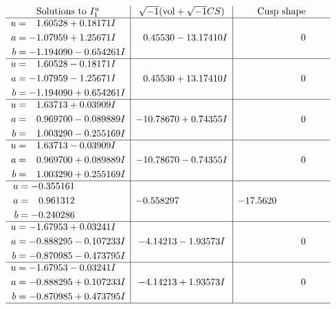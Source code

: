 \documentclass[1p]{elsarticle_modified}
\theoremstyle{definition}
\newcommand{\I}{\sqrt{-1}}
\begin{document}
$$\begin{array}{c|c|c}
\text{Solutions to }I^u_{1}& \I (\text{vol} + \sqrt{-1}CS) & \text{Cusp shape}\\
 \hline 
\begin{aligned}
u &= \phantom{-}1.60528 + 0.18171 I \\
a &= -1.07959 + 1.25671 I \\
b &= -1.194090 - 0.654261 I\end{aligned}
 & \phantom{-}0.45530 - 13.17410 I & \phantom{-0.000000 } 0 \\ \hline\begin{aligned}
u &= \phantom{-}1.60528 - 0.18171 I \\
a &= -1.07959 - 1.25671 I \\
b &= -1.194090 + 0.654261 I\end{aligned}
 & \phantom{-}0.45530 + 13.17410 I & \phantom{-0.000000 } 0 \\ \hline\begin{aligned}
u &= \phantom{-}1.63713 + 0.03909 I \\
a &= \phantom{-}0.969700 - 0.089889 I \\
b &= \phantom{-}1.003290 - 0.255169 I\end{aligned}
 & -10.78670 + 0.74355 I & \phantom{-0.000000 } 0 \\ \hline\begin{aligned}
u &= \phantom{-}1.63713 - 0.03909 I \\
a &= \phantom{-}0.969700 + 0.089889 I \\
b &= \phantom{-}1.003290 + 0.255169 I\end{aligned}
 & -10.78670 - 0.74355 I & \phantom{-0.000000 } 0 \\ \hline\begin{aligned}
u &= -0.355161\phantom{ +0.000000I} \\
a &= \phantom{-}0.961312\phantom{ +0.000000I} \\
b &= -0.240286\phantom{ +0.000000I}\end{aligned}
 & -0.558297\phantom{ +0.000000I} & -17.5620\phantom{ +0.000000I} \\ \hline\begin{aligned}
u &= -1.67953 + 0.03241 I \\
a &= -0.888295 - 0.107233 I \\
b &= -0.870985 - 0.473795 I\end{aligned}
 & -4.14213 - 1.93573 I & \phantom{-0.000000 } 0 \\ \hline\begin{aligned}
u &= -1.67953 - 0.03241 I \\
a &= -0.888295 + 0.107233 I \\
b &= -0.870985 + 0.473795 I\end{aligned}
 & -4.14213 + 1.93573 I & \phantom{-0.000000 } 0\\
 \hline 
 \end{array}$$\newpage\newpage\renewcommand{\arraystretch}{1}
\end{document}
